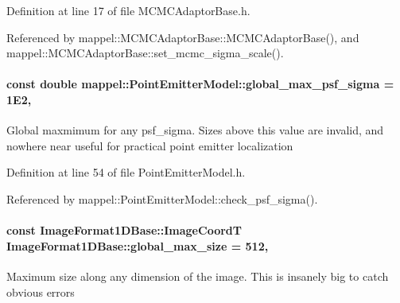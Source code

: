 Definition at line 17 of file M\+C\+M\+C\+Adaptor\+Base.\+h.



Referenced by mappel\+::\+M\+C\+M\+C\+Adaptor\+Base\+::\+M\+C\+M\+C\+Adaptor\+Base(), and mappel\+::\+M\+C\+M\+C\+Adaptor\+Base\+::set\+\_\+mcmc\+\_\+sigma\+\_\+scale().

\paragraph[{\texorpdfstring{global\+\_\+max\+\_\+psf\+\_\+sigma}{global_max_psf_sigma}}]{\setlength{\rightskip}{0pt plus 5cm}const double mappel\+::\+Point\+Emitter\+Model\+::global\+\_\+max\+\_\+psf\+\_\+sigma = 1\+E2\hspace{0.3cm}{\ttfamily [static]}, {\ttfamily [inherited]}}\hypertarget{classmappel_1_1PointEmitterModel_a5e79dba8966c25c4e9c675cd1a2cab70}{}\label{classmappel_1_1PointEmitterModel_a5e79dba8966c25c4e9c675cd1a2cab70}
Global maxmimum for any psf\+\_\+sigma. Sizes above this value are invalid, and nowhere near useful for practical point emitter localization 

Definition at line 54 of file Point\+Emitter\+Model.\+h.



Referenced by mappel\+::\+Point\+Emitter\+Model\+::check\+\_\+psf\+\_\+sigma().

\paragraph[{\texorpdfstring{global\+\_\+max\+\_\+size}{global_max_size}}]{\setlength{\rightskip}{0pt plus 5cm}const {\bf Image\+Format1\+D\+Base\+::\+Image\+CoordT} Image\+Format1\+D\+Base\+::global\+\_\+max\+\_\+size = 512\hspace{0.3cm}{\ttfamily [static]}, {\ttfamily [inherited]}}\hypertarget{classmappel_1_1ImageFormat1DBase_a5aafad20e635eae6f3609af56abad3ad}{}\label{classmappel_1_1ImageFormat1DBase_a5aafad20e635eae6f3609af56abad3ad}
Maximum size along any dimension of the image. This is insanely big to catch obvious errors 


